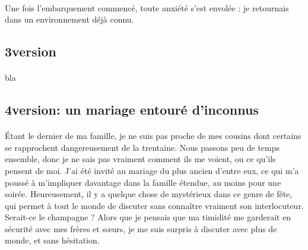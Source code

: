 \paragraph{}
Une fois l’embarquement commencé, toute anxiété s’est envolée : je retournais dans un environnement déjà connu. 

\subsection{3\ieme version}
\paragraph{}
bla

\subsection{4\ieme version: un mariage entouré d'inconnus}
\paragraph{}
Étant le dernier de ma famille, je ne suis pas proche de mes cousins dont certains se rapprochent dangereusement de la trentaine. Nous passons peu de temps ensemble, donc je ne sais pas vraiment comment ils me voient, ou ce qu’ils pensent de moi. J’ai été invité au mariage du plus ancien d’entre eux, ce qui m’a poussé à m’impliquer davantage dans la famille étendue, au moins pour une soirée. Heureusement, il y a quelque chose de mystérieux dans ce genre de fête, qui permet à tout le monde de discuter sans connaître vraiment son interlocuteur. Serait-ce le champagne ? Alors que je pensais que ma timidité me garderait en sécurité avec mes frères et sœurs, je me suis surpris à discuter avec plus de monde, et sans hésitation.
